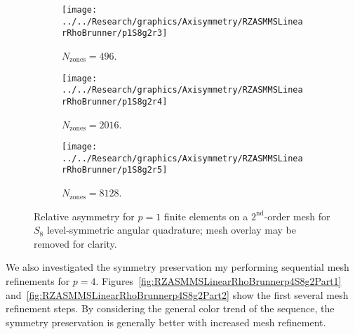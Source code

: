 \documentclass[12pt]{article}
\begin{document}
\begin{sidewaysfigure}[!htb]
\centering
\begin{subfigure}{0.33\textwidth}
\texttt{[image: ../../Research/graphics/Axisymmetry/RZASMMSLinearRhoBrunner/p1S8g2r3]}
\caption{$N_\text{zones}=496$.}
\end{subfigure}%
\begin{subfigure}{0.33\textwidth}
\texttt{[image: ../../Research/graphics/Axisymmetry/RZASMMSLinearRhoBrunner/p1S8g2r4]}
\caption{$N_\text{zones}=2016$.}
\end{subfigure}%
\begin{subfigure}{0.33\textwidth}
\texttt{[image: ../../Research/graphics/Axisymmetry/RZASMMSLinearRhoBrunner/p1S8g2r5]}
\caption{$N_\text{zones}=8128$.}
\end{subfigure}
\caption{Relative asymmetry for $p=1$ finite elements on a $2^\text{nd}$-order mesh for $S_8$ level-symmetric angular quadrature; mesh overlay may be removed for clarity.}
\label{fig:RZASMMSLinearRhoBrunnerp1S8g2Part2}
\end{sidewaysfigure}

We also investigated the symmetry preservation my performing sequential mesh refinements for $p=4$. Figures~\ref{fig:RZASMMSLinearRhoBrunnerp4S8g2Part1} and~\ref{fig:RZASMMSLinearRhoBrunnerp4S8g2Part2} show the first several mesh refinement steps. By considering the general color trend of the sequence, the symmetry preservation is generally better with increased mesh refinement.
\end{document}
